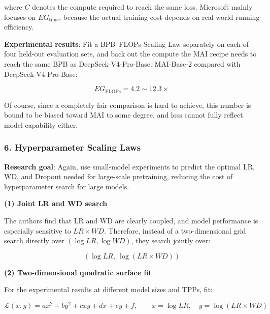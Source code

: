 \documentclass[
  english,
  11pt,
  a4paper,
]{article}
\newenvironment{NotesFormula}{%
  \par\noindent\begin{minipage}{\linewidth}%
  \setlength{\parindent}{2em}%
  \setlength{\parskip}{0.35em}%
}{\end{minipage}\par}
\begin{document}
where \(C\) denotes the compute required to reach the same loss.
Microsoft mainly focuses on \(EG_{\mathrm{time}}\), because the actual
training cost depends on real-world running efficiency.

\begin{NotesFormula}

\textbf{Experimental results}: Fit a BPB--FLOPs Scaling Law separately
on each of four held-out evaluation sets, and back out the compute the
MAI recipe needs to reach the same BPB as DeepSeek-V4-Pro-Base.
MAI-Base-2 compared with DeepSeek-V4-Pro-Base:

\[\boxed{EG_{\mathrm{FLOPs}}=4.2\sim12.3\times}\]

\end{NotesFormula}

Of course, since a completely fair comparison is hard to achieve, this
number is bound to be biased toward MAI to some degree, and loss cannot
fully reflect model capability either.

\subsubsection{6. Hyperparameter Scaling
Laws}\label{hyperparameter-scaling-laws}

\textbf{Research goal}: Again, use small-model experiments to predict
the optimal LR, WD, and Dropout needed for large-scale pretraining,
reducing the cost of hyperparameter search for large models.

\textbf{(1) Joint LR and WD search}

\begin{NotesFormula}

The authors find that LR and WD are clearly coupled, and model
performance is especially sensitive to \(LR\times WD\). Therefore,
instead of a two-dimensional grid search directly over
\((\log LR,\log WD)\), they search jointly over:

\[\boxed{(\log LR,\ \log(LR\times WD))}\]

\end{NotesFormula}

\textbf{(2) Two-dimensional quadratic surface fit}

\begin{NotesFormula}

For the experimental results at different model sizes and TPPs, fit:

\[\mathcal L(x,y)=ax^2+by^2+cxy+dx+ey+f,\qquad
x=\log LR,\quad y=\log(LR\times WD)\]

\end{NotesFormula}
\end{document}

